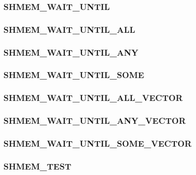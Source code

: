 \documentclass[10pt]{book}
\begin{document}
\subsubsection{\textbf{SHMEM\_WAIT\_UNTIL}}\label{subsec:shmem_wait_until}


\subsubsection{\textbf{SHMEM\_WAIT\_UNTIL\_ALL}}\label{subsec:shmem_wait_until_all}


\subsubsection{\textbf{SHMEM\_WAIT\_UNTIL\_ANY}}\label{subsec:shmem_wait_until_any}


\subsubsection{\textbf{SHMEM\_WAIT\_UNTIL\_SOME}}\label{subsec:shmem_wait_until_some}


\subsubsection{\textbf{SHMEM\_WAIT\_UNTIL\_ALL\_VECTOR}}\label{subsec:shmem_wait_until_all_vector}


\subsubsection{\textbf{SHMEM\_WAIT\_UNTIL\_ANY\_VECTOR}}\label{subsec:shmem_wait_until_any_vector}


\subsubsection{\textbf{SHMEM\_WAIT\_UNTIL\_SOME\_VECTOR}}\label{subsec:shmem_wait_until_some_vector}


\subsubsection{\textbf{SHMEM\_TEST}}\label{subsec:shmem_test}

\end{document}
